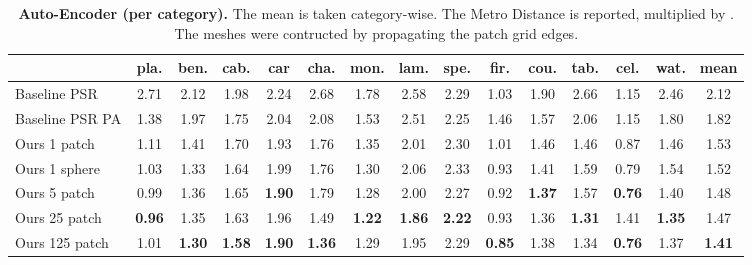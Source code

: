 \documentclass[10pt,twocolumn,letterpaper]{article}
\begin{document}
\begin{table*}[hb!]
\centering
{
\small
  \begin{tabular}{l|c|c|c|c|c|c|c|c|c|c|c|c|c|c}
   &  pla. &  ben. &  cab. &  car &  cha. &  mon. &  lam. &  spe. &  fir. &  cou. &  tab. &  cel. &  wat. &  mean \\
  \hline
 {Baseline PSR} & 2.71 & 2.12 & 1.98 & 2.24 & 2.68 & 1.78 & 2.58 & 2.29 & 1.03 & 1.90 & 2.66 & 1.15 & 2.46 & 2.12 \\
 {Baseline PSR PA} & 1.38 & 1.97 & 1.75 & 2.04 & 2.08 & 1.53 & 2.51 & 2.25 & 1.46 & 1.57 & 2.06 & 1.15 & 1.80 & 1.82 \\
 Ours 1 patch & 1.11 & 1.41 & 1.70 & 1.93 & 1.76 & 1.35 & 2.01 & 2.30 & 1.01 & 1.46 & 1.46 & 0.87 & 1.46 & 1.53  \\
 Ours 1 sphere & 1.03 & 1.33 & 1.64 & 1.99 & 1.76 & 1.30 & 2.06 & 2.33 & 0.93 & 1.41 & 1.59 & 0.79 & 1.54 & 1.52  \\
 Ours 5 patch & 0.99 & 1.36 & 1.65 & \textbf{1.90} & 1.79 & 1.28 & 2.00 & 2.27 & 0.92 & \textbf{1.37} & 1.57 & \textbf{0.76} & 1.40 & 1.48 \\
 Ours 25 patch & \textbf{0.96} & 1.35 & 1.63 & 1.96 & 1.49 & \textbf{1.22} & \textbf{1.86} & \textbf{2.22} & 0.93 & 1.36 & \textbf{1.31} & 1.41 & \textbf{1.35} & 1.47 \\
 Ours 125 patch & 1.01 & \textbf{1.30} & \textbf{1.58} & \textbf{1.90} & \textbf{1.36} & 1.29 & 1.95 & 2.29 & \textbf{0.85} & 1.38 & 1.34 & \textbf{0.76} & 1.37 & \textbf{1.41} \\


\hline
  \end{tabular}

  }
  \caption{\textbf{Auto-Encoder (per category).} The mean is taken category-wise. The Metro Distance is reported, multiplied by . The meshes were contructed by propagating the patch grid edges.
  }
  \label{tab:SVR_AE}
\end{table*}
\end{document}
